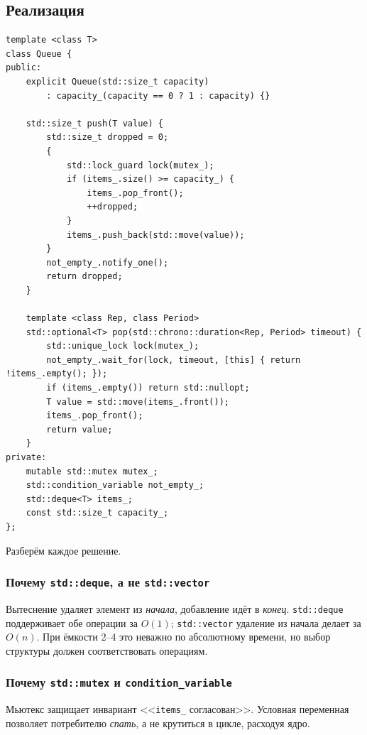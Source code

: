 \documentclass[11pt,a4paper]{article}
\theoremstyle{definition}
\theoremstyle{remark}
\begin{document}
\subsection{Реализация}

\begin{lstlisting}
template <class T>
class Queue {
public:
    explicit Queue(std::size_t capacity)
        : capacity_(capacity == 0 ? 1 : capacity) {}

    std::size_t push(T value) {
        std::size_t dropped = 0;
        {
            std::lock_guard lock(mutex_);
            if (items_.size() >= capacity_) {
                items_.pop_front();
                ++dropped;
            }
            items_.push_back(std::move(value));
        }
        not_empty_.notify_one();
        return dropped;
    }

    template <class Rep, class Period>
    std::optional<T> pop(std::chrono::duration<Rep, Period> timeout) {
        std::unique_lock lock(mutex_);
        not_empty_.wait_for(lock, timeout, [this] { return !items_.empty(); });
        if (items_.empty()) return std::nullopt;
        T value = std::move(items_.front());
        items_.pop_front();
        return value;
    }
private:
    mutable std::mutex mutex_;
    std::condition_variable not_empty_;
    std::deque<T> items_;
    const std::size_t capacity_;
};
\end{lstlisting}

Разберём каждое решение.

\subsubsection{Почему \texttt{std::deque}, а не \texttt{std::vector}}

Вытеснение удаляет элемент из \emph{начала}, добавление идёт в \emph{конец}.
\texttt{std::deque} поддерживает обе операции за $O(1)$; \texttt{std::vector}
удаление из начала делает за $O(n)$. При ёмкости 2--4 это неважно по
абсолютному времени, но выбор структуры должен соответствовать операциям.

\subsubsection{Почему \texttt{std::mutex} и \texttt{condition\_variable}}

Мьютекс защищает инвариант <<\texttt{items\_} согласован>>. Условная переменная
позволяет потребителю \emph{спать}, а не крутиться в цикле, расходуя ядро.
\end{document}

